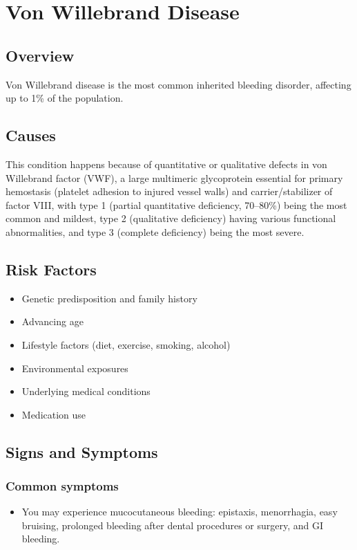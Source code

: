 \chapter{Von Willebrand Disease}
\label{sec:Von Willebrand Disease}

\section{Overview}
Von Willebrand disease is the most common inherited bleeding disorder, affecting up to 1\% of the population.
\section{Causes}
This condition happens because of quantitative or qualitative defects in von Willebrand factor (VWF), a large multimeric glycoprotein essential for primary hemostasis (platelet adhesion to injured vessel walls) and carrier/stabilizer of factor VIII, with type 1 (partial quantitative deficiency, 70--80\%) being the most common and mildest, type 2 (qualitative deficiency) having various functional abnormalities, and type 3 (complete deficiency) being the most severe.     
\section{Risk Factors}

\begin{itemize}[noitemsep]
  \item Genetic predisposition and family history
  \item Advancing age
  \item Lifestyle factors (diet, exercise, smoking, alcohol)
  \item Environmental exposures
  \item Underlying medical conditions
  \item Medication use
\end{itemize}
\section{Signs and Symptoms}

\subsection{Common symptoms}
\begin{itemize}[noitemsep]
  \item You may experience mucocutaneous bleeding: epistaxis, menorrhagia, easy bruising, prolonged bleeding after dental procedures or surgery, and GI bleeding. 
  \end{itemize}

